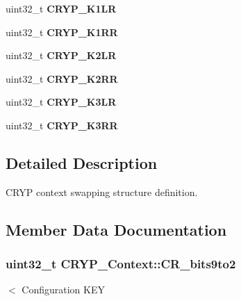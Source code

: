 \begin{DoxyCompactItemize}
\item 
\hypertarget{struct_c_r_y_p___context_a3f36964d098cc8ae308b2e5383d347d3}{}uint32\+\_\+t {\bfseries C\+R\+Y\+P\+\_\+\+K1\+L\+R}\label{struct_c_r_y_p___context_a3f36964d098cc8ae308b2e5383d347d3}

\item 
\hypertarget{struct_c_r_y_p___context_aa89211f0d83d04be2578e8f56c72669c}{}uint32\+\_\+t {\bfseries C\+R\+Y\+P\+\_\+\+K1\+R\+R}\label{struct_c_r_y_p___context_aa89211f0d83d04be2578e8f56c72669c}

\item 
\hypertarget{struct_c_r_y_p___context_a26fcb379bb56528df2cfabde8120b5f7}{}uint32\+\_\+t {\bfseries C\+R\+Y\+P\+\_\+\+K2\+L\+R}\label{struct_c_r_y_p___context_a26fcb379bb56528df2cfabde8120b5f7}

\item 
\hypertarget{struct_c_r_y_p___context_a2d49a621f48e73d1486ec1e719e2159e}{}uint32\+\_\+t {\bfseries C\+R\+Y\+P\+\_\+\+K2\+R\+R}\label{struct_c_r_y_p___context_a2d49a621f48e73d1486ec1e719e2159e}

\item 
\hypertarget{struct_c_r_y_p___context_ab64a851c884d0506021f49cf057ec4aa}{}uint32\+\_\+t {\bfseries C\+R\+Y\+P\+\_\+\+K3\+L\+R}\label{struct_c_r_y_p___context_ab64a851c884d0506021f49cf057ec4aa}

\item 
\hypertarget{struct_c_r_y_p___context_ae4cd1a3b6090d7305f0290cdee25cd5b}{}uint32\+\_\+t {\bfseries C\+R\+Y\+P\+\_\+\+K3\+R\+R}\label{struct_c_r_y_p___context_ae4cd1a3b6090d7305f0290cdee25cd5b}

\end{DoxyCompactItemize}


\subsection{Detailed Description}
C\+R\+Y\+P context swapping structure definition. 

\subsection{Member Data Documentation}
\hypertarget{struct_c_r_y_p___context_ad8cccfe37789c5a9054cbe8a7164d897}{}
\subsubsection[{C\+R\+\_\+bits9to2}]{\setlength{\rightskip}{0pt plus 5cm}uint32\+\_\+t C\+R\+Y\+P\+\_\+\+Context\+::\+C\+R\+\_\+bits9to2}\label{struct_c_r_y_p___context_ad8cccfe37789c5a9054cbe8a7164d897}
$<$ Configuration K\+E\+Y \hypertarget{struct_c_r_y_p___context_aafdd5ed6c7cafe8f45aabc5401501bf7}{}
